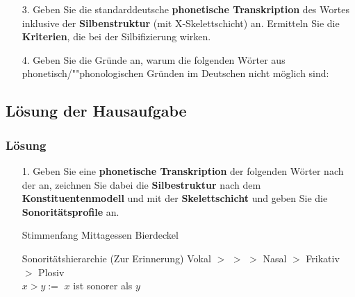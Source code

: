 {\begin{frame}
\begin{itemize}
Stellen Sie fest, ob alle Silben wohlgeformt sind. Falls nicht, benennen Sie die Verletzungen	
\ea\label{ex:HA2}
Urinstinkt
\z	
\item[3.] Geben Sie die standarddeutsche \textbf{phonetische Transkription} des Wortes  inklusive der \textbf{Silbenstruktur} (mit X-Skelettschicht) an. Ermitteln Sie die \textbf{Kriterien}, die bei der Silbifizierung wirken.

\item[4.] Geben Sie die Gründe an, warum die folgenden Wörter aus phonetisch/""phonologischen Gründen im Deutschen nicht möglich sind:

\eal\label{ex:HA3}
\ex[*]{\textipa{['Napl.O:t]}}
\ex[*]{\textipa{[a\;R.'tUng]}}
\zl

\end{itemize}

\end{frame}



\subsection*{Lösung der Hausaufgabe}
%


\begin{frame}%
\frametitle{Lösung}
\begin{itemize}

\item[1.] Geben Sie eine \textbf{phonetische Transkription} der folgenden Wörter nach der  an, zeichnen Sie dabei die \textbf{Silbestruktur} nach dem \textbf{Konstituentenmodell} und mit der \textbf{Skelettschicht} und geben Sie die \textbf{Sonoritätsprofile} an.

\begin{exe}
\exi{(\ref{ex:HA1})}
\begin{xlist}
\ex Stimmenfang
\ex Mittagessen
\ex Bierdeckel
\end{xlist}
\end{exe}

\begin{block}{Sonoritätshierarchie (Zur Erinnerung)}
Vokal $>$ \textipa{/\textscr /} $>$  $>$ Nasal $>$ Frikativ $>$ Plosiv \\
$x > y :=$ $x$ ist sonorer als $y$
\end{block}


\end{itemize}
\end{frame}}
